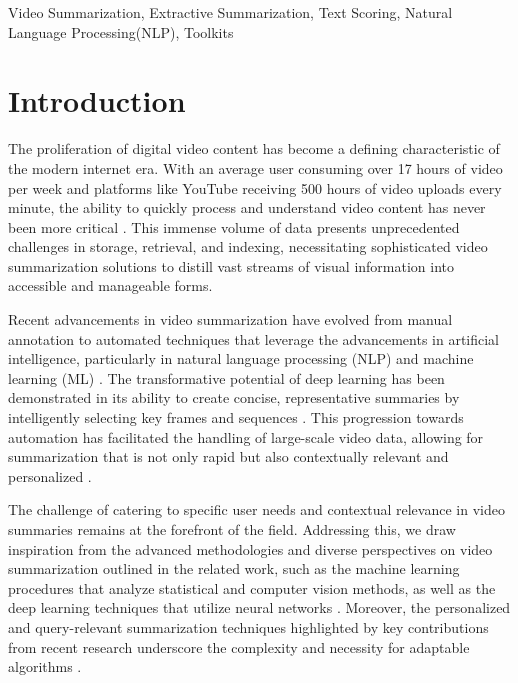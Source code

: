 \documentclass{ieeeaccess}
\begin{document}
\begin{keywords}
Video Summarization, Extractive Summarization, Text Scoring, Natural Language Processing(NLP), Toolkits
\end{keywords} 

\makeatletter
\newcommand{\@doi}{}
\makeatother

\maketitle

\section{Introduction}
\label{introduction}
The proliferation of digital video content has become a defining characteristic of the modern internet era. With an average user consuming over 17 hours of video per week and platforms like YouTube receiving 500 hours of video uploads every minute, the ability to quickly process and understand video content has never been more critical \cite{ref7}. This immense volume of data presents unprecedented challenges in storage, retrieval, and indexing, necessitating sophisticated video summarization solutions to distill vast streams of visual information into accessible and manageable forms.

Recent advancements in video summarization have evolved from manual annotation to automated techniques that leverage the advancements in artificial intelligence, particularly in natural language processing (NLP) and machine learning (ML) \cite{DNN5}. The transformative potential of deep learning has been demonstrated in its ability to create concise, representative summaries by intelligently selecting key frames and sequences \cite{duc}. This progression towards automation has facilitated the handling of large-scale video data, allowing for summarization that is not only rapid but also contextually relevant and personalized \cite{ref2}.

The challenge of catering to specific user needs and contextual relevance in video summaries remains at the forefront of the field. Addressing this, we draw inspiration from the advanced methodologies and diverse perspectives on video summarization outlined in the related work, such as the machine learning procedures that analyze statistical and computer vision methods, as well as the deep learning techniques that utilize neural networks \cite{Lexrank}. Moreover, the personalized and query-relevant summarization techniques highlighted by key contributions from recent research underscore the complexity and necessity for adaptable algorithms \cite{ref5}.
\end{document}
